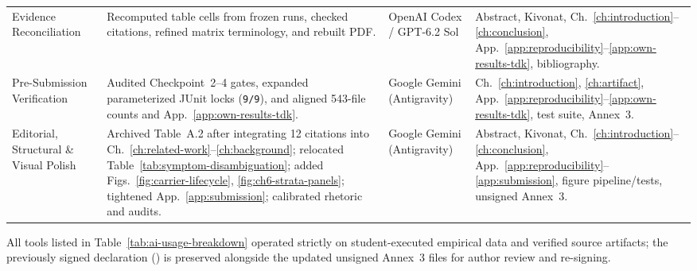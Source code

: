 \begin{table}[htbp]
\begin{tabularx}{\textwidth}{@{}>{\raggedright\arraybackslash}p{}>{\raggedright\arraybackslash}X>{\raggedright\arraybackslash}p{}>{\raggedright\arraybackslash}p{}@{}}
    \addlinespace[2pt]
    Evidence Reconciliation & Recomputed table cells from frozen runs, checked citations, refined matrix terminology, and rebuilt PDF. & OpenAI Codex / GPT-6.2 Sol & Abstract, Kivonat, Ch.~\ref{ch:introduction}--\ref{ch:conclusion}, App.~\ref{app:reproducibility}--\ref{app:own-results-tdk}, bibliography. \\
    \addlinespace[2pt]
    Pre-Submission Verification & Audited Checkpoint~2--4 gates, expanded parameterized JUnit locks (\texttt{9/9}), and aligned 543-file counts and App.~\ref{app:own-results-tdk}. & Google Gemini (Antigravity) & Ch.~\ref{ch:introduction}, \ref{ch:artifact}, App.~\ref{app:reproducibility}--\ref{app:own-results-tdk}, test suite, Annex~3. \\
    \addlinespace[2pt]
    Editorial, Structural \& Visual Polish & Archived Table~A.2 after integrating 12 citations into Ch.~\ref{ch:related-work}--\ref{ch:background}; relocated Table~\ref{tab:symptom-disambiguation}; added Figs.~\ref{fig:carrier-lifecycle}, \ref{fig:ch6-strata-panels}; tightened App.~\ref{app:submission}; calibrated rhetoric and audits. & Google Gemini (Antigravity) & Abstract, Kivonat, Ch.~\ref{ch:introduction}--\ref{ch:conclusion}, App.~\ref{app:reproducibility}--\ref{app:submission}, figure pipeline/tests, unsigned Annex~3. \\
    \bottomrule
  \end{tabularx}
\end{table}

All tools listed in Table~\ref{tab:ai-usage-breakdown} operated strictly on student-executed empirical data and verified source artifacts; the previously signed declaration () is preserved alongside the updated unsigned Annex~3 files for author review and re-signing.

